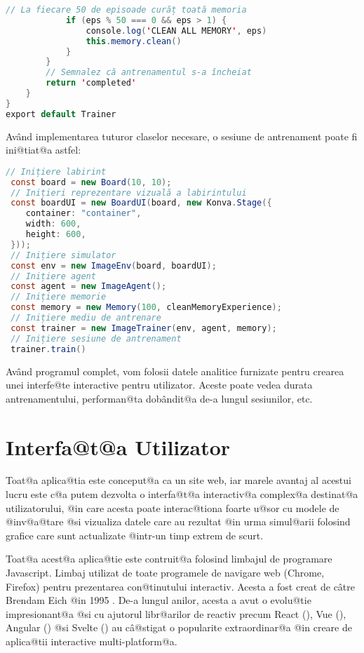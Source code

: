 \begin{lstlisting}[language=Java, caption={Structura clasei Trainer}]
            // La fiecare 50 de episoade curăț toată memoria
            if (eps % 50 === 0 && eps > 1) {
                console.log('CLEAN ALL MEMORY', eps)
                this.memory.clean()
            }
        }
        // Semnalez că antrenamentul s-a încheiat
        return 'completed'
    }
}
export default Trainer
\end{lstlisting}

Av\^ and implementarea tuturor claselor necesare, o sesiune de antrenament poate fi ini@tiat@a astfel:

\begin{lstlisting}[language=Java, caption={Inițierea unei sesiuni complete de antrenament}]
 // Inițiere labirint
 const board = new Board(10, 10);
 // Inițieri reprezentare vizuală a labirintului
 const boardUI = new BoardUI(board, new Konva.Stage({
	container: "container",
	width: 600,
	height: 600,
 }));
 // Inițiere simulator
 const env = new ImageEnv(board, boardUI);
 // Inițiere agent
 const agent = new ImageAgent();
 // Inițiere memorie
 const memory = new Memory(100, cleanMemoryExperience);
 // Inițiere mediu de antrenare
 const trainer = new ImageTrainer(env, agent, memory);
 // Inițiere sesiune de antrenament
 trainer.train()
\end{lstlisting}

Av\^ and programul complet, vom folosii datele analitice furnizate pentru crearea unei interfe@te interactive pentru utilizator. Aceste poate vedea durata antrenamentului, performan@ta dob\^ andit@a de-a lungul sesiunilor, etc.

\section{Interfa@t@a Utilizator}

Toat@a aplica@tia este conceput@a ca un site web, iar marele avantaj al acestui lucru este c@a putem dezvolta o interfa@t@a interactiv@a complex@a destinat@a utilizatorului, @in care acesta poate interac@tiona foarte u@sor cu modele de @inv@a@tare @si vizualiza datele care au rezultat @in urma simul@arii folosind grafice care sunt actualizate @intr-un timp extrem de scurt.

Toat@a acest@a aplica@tie este contruit@a folosind limbajul de programare Javascript. Limbaj utilizat de toate programele de navigare web (Chrome, Firefox) pentru prezentarea con@tinutului interactiv. Acesta a fost creat de c\^ atre Brendam Eich @in 1995 \cite{netscape}. De-a lungul anilor, acesta a avut o evolu@tie impresionant@a @si cu ajutorul libr@arilor de reactiv precum React (\cite{React}), Vue (\cite{Vue}), Angular (\cite{Angular}) @si Svelte (\cite{Svelte}) au c\^ a@stigat o popularite extraordinar@a @in creare de aplica@tii interactive multi-platform@a.

